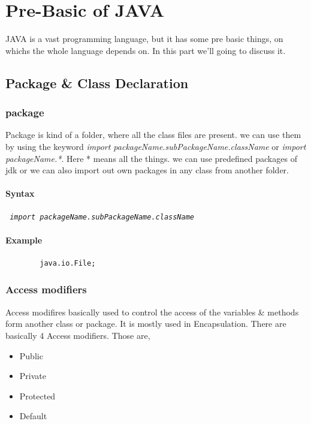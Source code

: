 \documentclass[A4 paper,openany]{book}  %
\begin{document}
% 
% 
\part{Pre-Basic of JAVA}

JAVA is a vast programming language, but it has some pre basic things, on whichs the whole language depends on. In this part we'll going to discuss it.

% 
% 
\chapter{Package \& Class Declaration}

% 
% 
\section{package}
Package is kind of a folder, where all the class files are present. we can use them by using the keyword \textit{import packageName.subPackageName.className} or
\textit{import packageName.*}. Here * means all the things. we can use predefined packages of jdk or we can also import out own packages in any class from another folder.
% 
% 
\subsection{Syntax}
\begin{center}
    \tt{
        \textit{import packageName.subPackageName.className}
    }
\end{center}
% 
% 
\subsection{Example}
\begin{center}
    \begin{verbatim}
        java.io.File;
    \end{verbatim}
\end{center}

% 
% 
\section{Access modifiers}
Access modifires basically used to control the access of the variables \& methods form another class or package. It is mostly used in Encapsulation.
There are basically 4 Access modifiers. Those are,
\begin{itemize}
    \item Public
    \item Private
    \item Protected
    \item Default
\end{itemize}
% 
%
\end{document}
